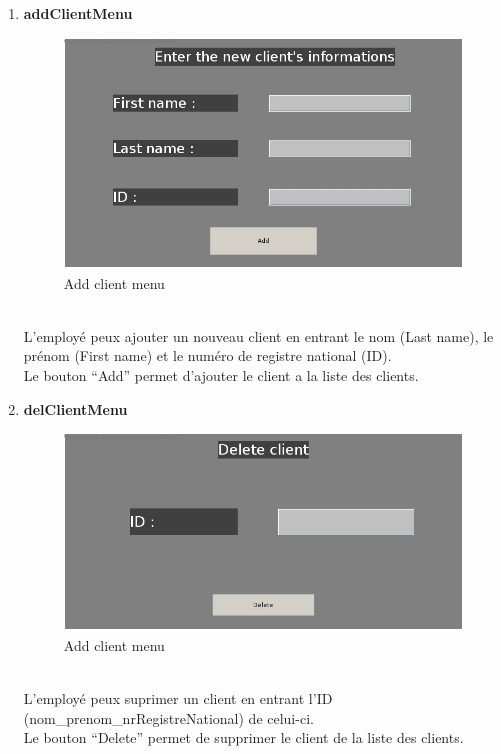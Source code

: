 \documentclass[../rapport.tex]{subfiles}
\begin{document}
\begin{enumerate}
\item \textbf{addClientMenu} \\
		\begin{figure}[h!]
				\centering \includegraphics[scale=0.2]{ressources/photos_diagrammes/app2/gui/addClientMenu.jpg}
				\caption{Add client menu}
		\end{figure}
		\\
L'employé peux ajouter un nouveau client en entrant le nom (Last name), le prénom (First name) et le numéro de registre national (ID).\\
Le bouton ``Add'' permet d'ajouter le client a la liste des clients.\\

\item \textbf{delClientMenu} \\
		\begin{figure}[h!]
				\centering \includegraphics[scale=0.2]{ressources/photos_diagrammes/app2/gui/deleteClientMenu.jpg}
				\caption{Add client menu}
		\end{figure}
		\\
L'employé peux suprimer un client en entrant l'ID (nom_prenom_nrRegistreNational) de celui-ci.\\
Le bouton ``Delete'' permet de supprimer le client de la liste des clients.\\


\end{enumerate}
\end{document}
